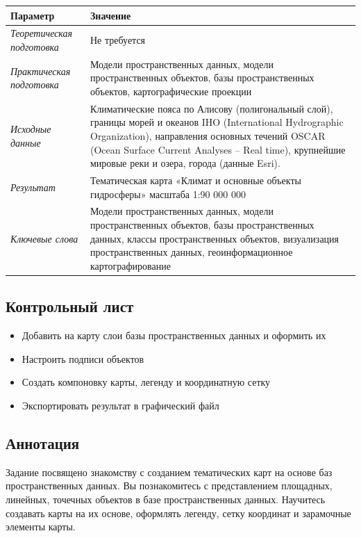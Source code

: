 \documentclass[]{book}
\providecommand{\tightlist}{%
  \setlength{\itemsep}{0pt}\setlength{\parskip}{0pt}}
\theoremstyle{definition}
\theoremstyle{definition}
\theoremstyle{definition}
\theoremstyle{remark}
\begin{document}
\begin{longtable}[]{@{}ll@{}}
\toprule
Параметр & Значение\tabularnewline
\midrule
\endhead
\emph{Теоретическая подготовка} & Не требуется\tabularnewline
\emph{Практическая подготовка} & Модели пространственных данных, модели
пространственных объектов, базы пространственных объектов,
картографические проекции\tabularnewline
\emph{Исходные данные} & Климатические пояса по Алисову (полигональный
слой), границы морей и океанов IHO (International Hydrographic
Organization), направления основных течений OSCAR (Ocean Surface Current
Analyses -- Real time), крупнейшие мировые реки и озера, города (данные
Esri).\tabularnewline
\emph{Результат} & Тематическая карта «Климат и основные объекты
гидросферы» масштаба 1:90 000 000\tabularnewline
\emph{Ключевые слова} & Модели пространственных данных, модели
пространственных объектов, базы пространственных данных, классы
пространственных объектов, визуализация пространственных данных,
геоинформационное картографирование\tabularnewline
\bottomrule
\end{longtable}

\hypertarget{map-design-climates-control}{%
\subsection{Контрольный лист}\label{map-design-climates-control}}

\begin{itemize}
\tightlist
\item
  Добавить на карту слои базы пространственных данных и оформить их
\item
  Настроить подписи объектов
\item
  Создать компоновку карты, легенду и координатную сетку
\item
  Экспортировать результат в графический файл
\end{itemize}

\hypertarget{map-design-climates-annotation}{%
\subsection{Аннотация}\label{map-design-climates-annotation}}

Задание посвящено знакомству с созданием тематических карт на основе баз
пространственных данных. Вы познакомитесь с представлением площадных,
линейных, точечных объектов в базе пространственных данных. Научитесь
создавать карты на их основе, оформлять легенду, сетку координат и
зарамочные элементы карты.
\end{document}
